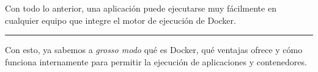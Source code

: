 Con todo lo anterior, una aplicación puede ejecutarse muy fácilmente en cualquier
equipo que integre el motor de ejecución de Docker.

\noindent\rule{\linewidth}{.2pt}

Con esto, ya sabemos a \textit{grosso modo} qué es Docker, qué ventajas ofrece y cómo
funciona internamente para permitir la ejecución de aplicaciones y contenedores.
